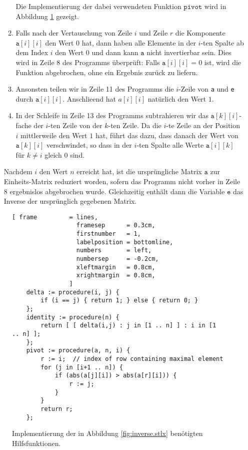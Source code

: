 \begin{enumerate}
\begin{enumerate}
              Die Implementierung der dabei verwendeten Funktion $\mathtt{pivot}$ wird in Abbildung
              \ref{fig:inverse.stlx-pivot} gezeigt.
      \item Falls nach der Vertauschung von Zeile $i$ und Zeile $r$ die Komponente
            $\mathtt{a}[i][i]$ den Wert $0$ hat, dann haben alle
            Elemente in der $i$-ten Spalte ab dem Index $i$ den Wert $0$ und dann kann $\mathtt{a}$ nicht
            invertierbar sein.  Dies wird in Zeile 8 des Programms \"{u}berpr\"{u}ft: Falls 
            $\mathtt{a}[i][i] = 0$ ist, wird die Funktion abgebrochen, ohne ein Ergebnis zur\"{u}ck zu
            liefern. 
      \item Ansonsten teilen wir in Zeile 11 des Programms die $i$-Zeile von \texttt{a} und
            \texttt{e} durch $\mathtt{a}[i][i]$.  Anschlie\3end hat $a[i][i]$ nat\"{u}rlich den Wert $1$.
      \item In der Schleife in Zeile 13 des Programms subtrahieren wir das $\mathtt{a}[k][i]$-fache
            der $i$-ten Zeile von der $k$-ten Zeile.  Da die $i$-te Zeile an der Position $i$
            mittlerweile den Wert $1$ hat, f\"{u}hrt das dazu, dass danach der Wert von
            $\mathtt{a}[k][i]$ verschwindet, so dass in der $i$-ten Spalte alle Werte
            $\mathtt{a}[i][k]$ f\"{u}r $k \not= i$ gleich $0$ sind.
      \end{enumerate}
      Nachdem $i$ den Wert $n$ erreicht hat, ist die urspr\"{u}ngliche Matrix $\mathtt{a}$ zur
      Einheits-Matrix reduziert worden, sofern das Programm nicht vorher in Zeile 8 ergebnislos  
      abgebrochen wurde.  Gleichzeitig enth\"{a}lt dann die Variable $\mathtt{e}$ das Inverse der
      urspr\"{u}nglich gegebenen Matrix.
\end{enumerate}

\begin{figure}[!ht]
\centering
\begin{Verbatim}[ frame         = lines, 
                  framesep      = 0.3cm, 
                  firstnumber   = 1,
                  labelposition = bottomline,
                  numbers       = left,
                  numbersep     = -0.2cm,
                  xleftmargin   = 0.8cm,
                  xrightmargin  = 0.8cm,
                ]
    delta := procedure(i, j) {
        if (i == j) { return 1; } else { return 0; }
    };
    identity := procedure(n) {
        return [ [ delta(i,j) : j in [1 .. n] ] : i in [1 .. n] ];
    };
    pivot := procedure(a, n, i) {
        r := i;  // index of row containing maximal element
        for (j in [i+1 .. n]) {
            if (abs(a[j][i]) > abs(a[r][i])) {
                r := j;
            }
        }
        return r;
    };
\end{Verbatim}
\vspace*{-0.3cm}
\caption{Implementierung der in Abbildung \ref{fig:inverse.stlx} ben\"{o}tigten Hilfsfunktionen.}
\label{fig:inverse.stlx-pivot}
\end{figure}


